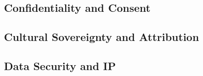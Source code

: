\subsection{Confidentiality and Consent}
\subsection{Cultural Sovereignty and Attribution}
\subsection{Data Security and IP}